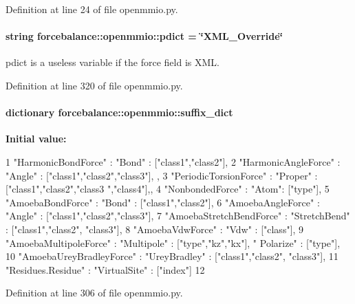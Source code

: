 \-Definition at line 24 of file openmmio.\-py.

\hypertarget{namespaceforcebalance_1_1openmmio_a665be6f97a91b103188288e8cd1de9a8}{
\paragraph[{pdict}]{\setlength{\rightskip}{0pt plus 5cm}string {\bf forcebalance\-::openmmio\-::pdict} = \char`\"{}\-X\-M\-L\-\_\-\-Override\char`\"{}}}\label{namespaceforcebalance_1_1openmmio_a665be6f97a91b103188288e8cd1de9a8}


pdict is a useless variable if the force field is \-X\-M\-L. 



\-Definition at line 320 of file openmmio.\-py.

\hypertarget{namespaceforcebalance_1_1openmmio_a2a12654c34f4f34e81f575f7b470bf8e}{
\paragraph[{suffix\-\_\-dict}]{\setlength{\rightskip}{0pt plus 5cm}dictionary {\bf forcebalance\-::openmmio\-::suffix\-\_\-dict}}}\label{namespaceforcebalance_1_1openmmio_a2a12654c34f4f34e81f575f7b470bf8e}
{\bfseries \-Initial value\-:}
\begin{DoxyCode}
1 { "HarmonicBondForce" : {"Bond" : ["class1","class2"]},
2                 "HarmonicAngleForce" : {"Angle" : ["class1","class2","class3"],
      },
3                 "PeriodicTorsionForce" : {"Proper" : ["class1","class2","class3
      ","class4"],},
4                 "NonbondedForce" : {"Atom": ["type"]},
5                 "AmoebaBondForce" : {"Bond" : ["class1","class2"]},
6                 "AmoebaAngleForce" : {"Angle" : ["class1","class2","class3"]},
7                 "AmoebaStretchBendForce" : {"StretchBend" : ["class1","class2",
      "class3"]},
8                 "AmoebaVdwForce" : {"Vdw" : ["class"]},
9                 "AmoebaMultipoleForce" : {"Multipole" : ["type","kz","kx"], "
      Polarize" : ["type"]},
10                 "AmoebaUreyBradleyForce" : {"UreyBradley" : ["class1","class2",
      "class3"]},
11                 "Residues.Residue" : {"VirtualSite" : ["index"]}
12                 }
\end{DoxyCode}


\-Definition at line 306 of file openmmio.\-py.

